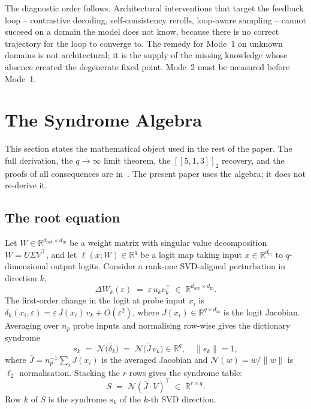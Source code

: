 \documentclass[11pt,a4paper]{article}
\newcommand{\Ccode}[3]{[\![#1,#2,#3]\!]}
\newcommand{\Jbar}{\bar{J}}
\newcommand{\Norm}{\mathcal{N}}
\begin{document}
The diagnostic order follows. Architectural interventions that target the feedback loop -- contrastive decoding, self-consistency rerolls, loop-aware sampling -- cannot succeed on a domain the model does not know, because there is no correct trajectory for the loop to converge to. The remedy for Mode~1 on unknown domains is not architectural; it is the supply of the missing knowledge whose absence created the degenerate fixed point. Mode~2 must be measured before Mode~1.


\section{The Syndrome Algebra}
\label{sec:algebra}

This section states the mathematical object used in the rest of the paper. The full derivation, the $q \to \infty$ limit theorem, the $\Ccode{5}{1}{3}_2$ recovery, and the proofs of all consequences are in~\cite{SyndromeAlgebra}. The present paper uses the algebra; it does not re-derive it.

\subsection{The root equation}
\label{sec:algebra-root}

Let $W \in \mathbb{R}^{d_{\mathrm{out}} \times d_{\mathrm{in}}}$ be a weight matrix with singular value decomposition $W = U \Sigma V^\top$, and let $\ell(x; W) \in \mathbb{R}^q$ be a logit map taking input $x \in \mathbb{R}^{d_{\mathrm{in}}}$ to $q$-dimensional output logits. Consider a rank-one SVD-aligned perturbation in direction $k$,
\[
   \Delta W_k(\varepsilon) \;=\; \varepsilon\, u_k v_k^\top
   \;\in\; \mathbb{R}^{d_{\mathrm{out}} \times d_{\mathrm{in}}}.
\]
The first-order change in the logit at probe input $x_i$ is $\delta_k(x_i, \varepsilon) = \varepsilon\, J(x_i)\, v_k + O(\varepsilon^2)$, where $J(x_i) \in \mathbb{R}^{q \times d_{\mathrm{in}}}$ is the logit Jacobian. Averaging over $n_p$ probe inputs and normalising row-wise gives the dictionary syndrome
\[
   s_k \;=\; \Norm\bigl(\bar\delta_k\bigr)
         \;=\; \Norm\bigl(\Jbar\, v_k\bigr) \in \mathbb{R}^q,
   \quad \|s_k\| = 1,
\]
where $\Jbar = n_p^{-1} \sum_i J(x_i)$ is the averaged Jacobian and $\Norm(w) = w/\|w\|$ is $\ell_2$ normalisation. Stacking the $r$ rows gives the syndrome table:
\begin{equation}
\label{eq:syndrome}
\boxed{\;
   S \;=\; \Norm(\Jbar \cdot V)^\top
   \;\in\; \mathbb{R}^{r \times q}.
\;}
\end{equation}
Row $k$ of $S$ is the syndrome $s_k$ of the $k$-th SVD direction.
\end{document}
